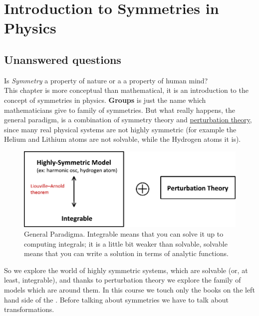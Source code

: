 \documentclass[../main.tex]{subfiles}
\begin{document}
\setchapterpreamble[u]{\margintoc}
\chapter[Introduction to Symmetries in Physics]{Introduction to Symmetries in Physics\footnotemark[0]}

\section{Unanswered questions}
Is \textit{Symmetry} a property of nature or a a property of human mind?\\
This chapter is more conceptual than mathematical, it is an introduction to the concept of symmetries in physics. \textbf{Groups} is just the name which mathematicians give to family of symmetries. But what really happens, the general paradigm, is a combination of symmetry theory and \href{https://en.wikipedia.org/wiki/Perturbation_theory}{perturbation theory}, since many real physical systems are not highly symmetric (for example the Helium and Lithium atoms are not solvable, while the Hydrogen atoms it is).
\begin{figure}[H]
	\includegraphics[width=1\textwidth]{images/General_Paradigm.pdf}
	\caption[General Paradigma]{General Paradigma. Integrable means that you can solve it up to computing integrals; it is a little bit weaker than solvable, solvable means that you can write a solution in terms of analytic functions.}
\end{figure}
So we explore the world of highly symmetric systems, which are solvable (or, at least, integrable), and thanks to perturbation theory we explore the family of models which are around them. In this course we touch only the books on the left hand side of the . Before talking about symmetries we have to talk about transformations.
\end{document}
